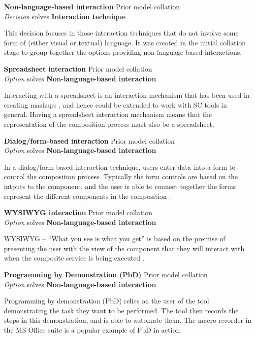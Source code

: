 \textbf{Non-language-based interaction} \hfill Prior model collation \\ \emph{Decision} \hfill solves \textbf{Interaction technique}

This decision focuses in those interaction techniques that do not involve some form of (either visual or textual) language. It was created in the initial collation stage to group together the options providing non-language based interactions.

\textbf{Spreadsheet interaction} \hfill Prior model collation \cite{Aghaee2012,Minhas2012,Fischer2009} \\ \emph{Option} \hfill solves \textbf{Non-language-based interaction}

Interacting with a spreadsheet is an interaction mechanism that has been used in creating mashups \cite{Skrobo2011}, and hence could be extended to work with SC tools in general. Having a spreadsheet interaction mechanism means that the representation of the composition process must also be a spreadsheet.

\textbf{Dialog/form-based interaction} \hfill Prior model collation \cite{Aghaee2012} \\ \emph{Option} \hfill solves \textbf{Non-language-based interaction}

In a dialog/form-based interaction technique, users enter data into a form to control the composition process. Typically the form controls are based on the intputs to the component, and the user is able to connect together the forms represent the different components in the composition \cite{Aghaee2012}.

\textbf{WYSIWYG interaction} \hfill Prior model collation \cite{Aghaee2012} \\ \emph{Option} \hfill solves \textbf{Non-language-based interaction}

WYSIWYG -- ``What you see is what you get'' is based on the premise of presenting the user with the view of the component that they will interact with when the composite service is being executed \cite{Aghaee2012}.

\textbf{Programming by Demonstration (PbD)} \hfill Prior model collation \cite{Grammel2010,Aghaee2012,Minhas2012,Fischer2009} \\ \emph{Option} \hfill solves \textbf{Non-language-based interaction}

Programming by demonstration (PbD) relies on the user of the tool demonstrating the task they want to be performed. The tool then records the steps in this demonstration, and is able to automate them. The macro recorder in the MS Office suite is a popular example of PbD in action.

